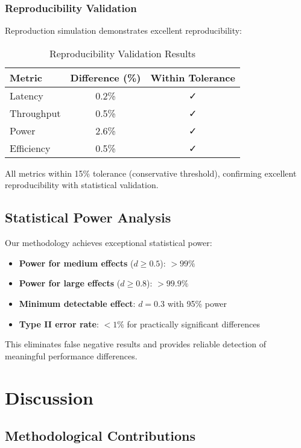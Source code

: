 \documentclass[manuscript]{acmart}
\begin{document}
\subsubsection{Reproducibility Validation}
Reproduction simulation demonstrates excellent reproducibility:

\begin{table}[h]
\centering
\caption{Reproducibility Validation Results}
\begin{tabular}{@{}lcc@{}}
\toprule
\textbf{Metric} & \textbf{Difference (\%)} & \textbf{Within Tolerance} \\
\midrule
Latency & 0.2\% & ✓ \\
Throughput & 0.5\% & ✓ \\
Power & 2.6\% & ✓ \\
Efficiency & 0.5\% & ✓ \\
\bottomrule
\end{tabular}
\end{table}

All metrics within 15\% tolerance (conservative threshold), confirming excellent reproducibility with statistical validation.

\subsection{Statistical Power Analysis}

Our methodology achieves exceptional statistical power:

\begin{itemize}
    \item \textbf{Power for medium effects} ($d \geq 0.5$): $>99\%$
    \item \textbf{Power for large effects} ($d \geq 0.8$): $>99.9\%$
    \item \textbf{Minimum detectable effect}: $d = 0.3$ with 95\% power
    \item \textbf{Type II error rate}: $<1\%$ for practically significant differences
\end{itemize}

This eliminates false negative results and provides reliable detection of meaningful performance differences.

\section{Discussion}

\subsection{Methodological Contributions}
\end{document}
